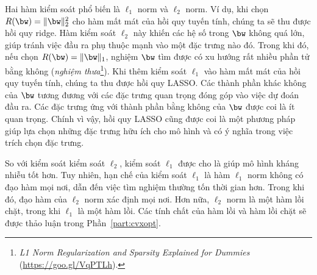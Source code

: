  
 

Hai hàm kiểm soát phổ biến là $\ell_1$ norm và $\ell_2$ norm.
Ví dụ, khi chọn $R(\bw) = \|\bw\|_2^2$ cho hàm mất mát của hồi quy tuyến tính,
chúng ta sẽ thu được hồi quy ridge. Hàm kiểm soát $\ell_2$ này khiến các hệ số
trong $\bw$ không quá lớn, giúp tránh việc đầu ra phụ thuộc mạnh vào một
đặc trưng nào đó. Trong khi đó, nếu chọn $R(\bw) = \|\bw\|_1$, nghiệm $\bw$ tìm
được có xu hướng rất nhiều phần tử bằng không (\textit{nghiệm thưa}\footnote{\textit{L1 Norm Regularization and Sparsity Explained for
Dummies} (\url{https://goo.gl/VqPTLh}).}). Khi thêm kiểm soát $\ell_1$ vào
hàm mất mát của hồi quy tuyến tính, chúng ta thu được hồi quy LASSO. Các
thành phần khác không của $\bw$ tương đương với các đặc trưng quan trọng đóng
góp vào việc dự đoán đầu ra. Các đặc trưng ứng với thành phần bằng không của
$\bw$ được coi là ít quan trọng. Chính vì vậy, hồi quy LASSO cũng được coi là
một phương pháp giúp lựa chọn những đặc trưng hữu ích cho mô hình và có ý nghĩa trong việc trích chọn đặc trưng. 

So với kiểm soát kiểm soát $\ell_2$, kiểm soát $\ell_1$ được cho là giúp mô hình kháng nhiễu tốt hơn. Tuy nhiên, hạn chế của kiểm soát $\ell_1$ là hàm $\ell_1$ norm không có đạo hàm mọi nơi, dẫn đến việc tìm nghiệm thường tốn thời gian hơn. Trong khi đó, đạo hàm của $\ell_2$ norm xác định mọi nơi. Hơn nữa, $\ell_2$ norm là một hàm lồi chặt, trong khi $\ell_1$ là một hàm lồi. Các tính chất của hàm lồi và hàm lồi chặt sẽ được thảo luận trong Phần~\ref{part:cvxopt}.


